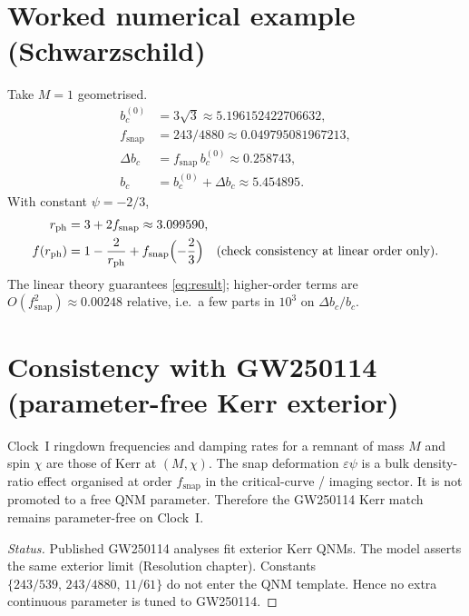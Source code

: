 \section{Worked numerical example (Schwarzschild)}
\label{sec:numeric}

Take \(M=1\) geometrised.
\begin{align}
b_c^{(0)}
&=
3\sqrt{3}
\approx 5.196152422706632,\\
f_{\mathrm{snap}}
&=
243/4880
\approx 0.049795081967213,\\
\Delta b_c
&=
f_{\mathrm{snap}}\,b_c^{(0)}
\approx 0.258743,\\
b_c
&=
b_c^{(0)}+\Delta b_c
\approx 5.454895.
\end{align}
With constant \(\psi=-2/3\),
\begin{align}
r_{\mathrm{ph}}
&=
3+2f_{\mathrm{snap}}
\approx 3.099590,\\
f(r_{\mathrm{ph}})
&=
1-\frac{2}{r_{\mathrm{ph}}}+f_{\mathrm{snap}}\Bigl(-\frac{2}{3}\Bigr)
\quad\text{(check consistency at linear order only)}.
\end{align}
The linear theory guarantees \eqref{eq:result}; higher-order terms are
\(O(f_{\mathrm{snap}}^2)\approx 0.00248\) relative, i.e.\ a few parts in \(10^{3}\) on
\(\Delta b_c/b_c\).

\section{Consistency with GW250114 (parameter-free Kerr exterior)}
\label{sec:gw}

\begin{lemma}
\label{lem:qnm}
Clock~I ringdown frequencies and damping rates for a remnant of mass \(M\) and
spin \(\chi\) are those of Kerr at \((M,\chi)\). The snap deformation
\(\varepsilon\psi\) is a bulk density-ratio effect organised at order
\(f_{\mathrm{snap}}\) in the critical-curve / imaging sector. It is not promoted to
a free QNM parameter. Therefore the GW250114 Kerr match remains
parameter-free on Clock~I.
\end{lemma}

\begin{proof}[Status]
Published GW250114 analyses fit exterior Kerr QNMs. The model asserts the
same exterior limit (Resolution chapter). Constants
\(\{243/539,\,243/4880,\,11/61\}\) do not enter the QNM template. Hence no
extra continuous parameter is tuned to GW250114.
\end{proof}

